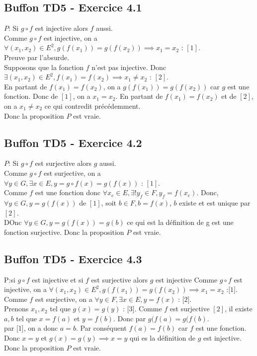 \documentclass[]{book}
\theoremstyle{definition}
\begin{document}
\subsection*{Buffon TD5 - Exercice 4.1}
$P$: Si $g \circ f$ est injective alors $f$ aussi.\\
Comme $g \circ f$ est injective, on a $\forall (x_1, x_2) \in E^2, g(f(x_1)) = g(f(x_2)) \implies x_1 = x_2 \textrm{  : } [1]$.\\
Preuve par l'absurde.\\
Supposons que la fonction $f$ n'est pas injective. Donc $\exists (x_1, x_2) \in E^2, f(x_1)=f(x_2) \implies x_1 \neq x_2 \textrm{  : } [2]$.\\
En partant de $f(x_1)=f(x_2)$, on a $g(f(x_1))=g(f(x_2))$ car $g$ est une fonction. Donc de $[1]$, on a $x_1 = x_2$.
En partant de $f(x_1)=f(x_2)$ et de $[2]$, on a $x_1 \neq x_2$ ce qui contredit pr\'ec\'edemment.\\
Donc la proposition $P$ est vraie.

\subsection*{Buffon TD5 - Exercice 4.2}
$P$: Si $g \circ f$ est surjective alors $g$ aussi.\\
Comme $g \circ f$ est surjective, on a $\forall y \in G, \exists x \in E, y = g \circ f(x) = g(f(x)) \textrm{  : } [1]$.\\
Comme $f$ est une fonction donc $\forall x_e \in E, \exists !y_f \in F, y_f = f(x_e)$.
Donc, $\forall y \in G, y=g(f(x))$ de $[1]$, soit $b \in F, b = f(x)$, $b$ existe et est unique par $[2]$. \\
DOnc $ \forall y \in G, y=g(f(x))=g(b)$ ce qui est la d\'efinition de g est une fonction surjective.
Donc la proposition $P$ est vraie.

\subsection*{Buffon TD5 - Exercice 4.3}
P:si $g \circ f$ est injective et si $f$ est surjective alors $g$ est injective
Comme $g \circ f$ est injective, on a $\forall (x_1, x_2) \in E^2, g(f(x_1)) = g(f(x_2)) \implies x_1 = x_2 \textrm{  :[1]}$.\\
Comme $f$ est surjective, on a $\forall y \in F, \exists x \in E, y = f(x) \textrm{  : [2]}$.\\

Prenons $x_1, x_2$ tel que $g(x) = g(y) \textrm{  : [3]}$. Comme $f$ est surjective $[2]$, il existe $a,b$ tel que $x=f(a)$ et $y=f(b)$. Donc par $g(f(a) = g(f(b)$.\\
par [1], on a donc $a=b$. Par cons\'equent $f(a) = f(b)$ car $f$ est une fonction. Donc $x=y$ et $g(x) = g(y) \implies x = y$ qui es la d\'efinition de $g$ est injective.\\
Donc la proposition $P$ est vraie.
\end{document}
